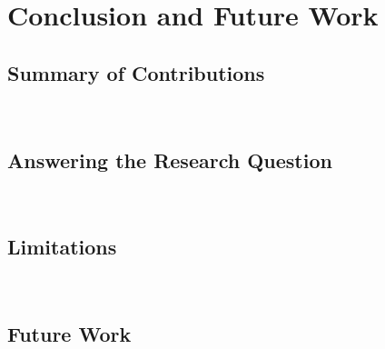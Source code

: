 \documentclass[a4paper,11pt]{article}
\begin{document}
\section{Conclusion and Future Work}

\subsection{Summary of Contributions}
\ %

\subsection{Answering the Research Question}
\ %

\subsection{Limitations}
\ %

\subsection{Future Work}
\ %

\end{document}
